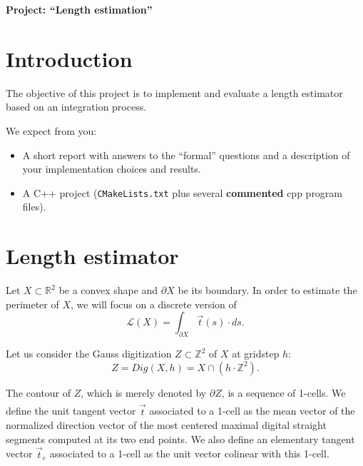 \documentclass[a4paper, 11pt]{article}
\title{}
\author{}
\date{}
\begin{document}
\begin{center}
	\LARGE \textbf{Project: ``Length estimation''}
\end{center}

\section*{Introduction}

The objective of this project is to implement and evaluate a length estimator
based on an integration process.


We expect from you:
\begin{itemize}
\item A short report with answers to the ``formal'' questions and a
  description of your implementation choices and results.
\item A C++ project (\texttt{CMakeLists.txt} plus several
  \textbf{commented} cpp program files).
\end{itemize}


\section{Length estimator}

Let $X \subset \mathbb{R}^2$ be a convex shape and $\partial X$ be its boundary. 
In order to estimate the perimeter of $X$, we will focus on a discrete version of 
\begin{equation}
\label{eq:length}
\mathcal{L}(X) = \int_{\partial X} \vec{t}(s) \cdot ds.
\end{equation}

Let us consider the Gauss digitization $Z \subset \mathbb{Z}^2$ of $X$ at gridstep $h$:
\begin{displaymath}
  Z = Dig(X,h) = X\cap (h\cdot \mathbb{Z}^2).
\end{displaymath}

The contour of $Z$, which is merely denoted by $\partial Z$, is a sequence of 1-cells.  
We define the unit tangent vector $\hat{\vec{t}}$ associated to a 1-cell as the mean
vector of the normalized direction vector of the most centered maximal digital straight segments
computed at its two end points. We also define an elementary tangent vector $\vec{t}_{e}$
associated to a 1-cell as the unit vector colinear with this 1-cell. 
\end{document}
